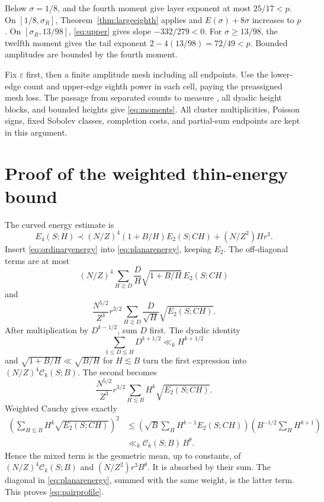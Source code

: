 \documentclass[11pt]{amsart}
\numberwithin{equation}{section}
\begin{document}
Below $\sigma=1/8$, \cite[Theorem 1.3]{dFP} and the
fourth moment give layer exponent at most $25/17<p$.
On $[1/8,\sigma_R]$, Theorem~\ref{thm:largeeighth} applies and
$E(\sigma)+8\sigma$ increases to $p$.
On $[\sigma_R,13/98]$, \eqref{eq:upper} gives slope $-332/279<0$.
For $\sigma\ge13/98$, the twelfth moment gives the tail exponent
$2-4(13/98)=72/49<p$. Bounded amplitudes are bounded by the fourth moment.

Fix $\varepsilon$ first, then a finite amplitude mesh including all endpoints.
Use the lower-edge count and upper-edge eighth power in each cell,
paying the preassigned mesh loss. The passage from separated counts to
measure \cite[Section~\ref*{six-sec:moment}]{Weighted},
all dyadic height blocks, and bounded heights give \eqref{eq:moments}.
All cluster multiplicities, Poisson signs, fixed Sobolev classes,
completion costs, and partial-sum endpoints are kept
in this argument.



\appendix
\section{Proof of the weighted thin-energy bound}\label{app:pairproof}

The curved energy estimate
\cite[Proposition~\ref*{six-prop:curv}]{Weighted} is
\begin{equation}\label{eq:ordinaryenergy}
 E_4(S;H)\prec (N/Z)^4(1+B/H)E_2(S;CH)
                  +(N/Z^2)H r^3.
\end{equation}
Insert \eqref{eq:ordinaryenergy} into \eqref{eq:planarenergy}, keeping \(E_2\).
The off-diagonal terms are at most
\[
 (N/Z)^4\sum_{H\gtrsim D}\frac DH
               \sqrt{1+B/H}\,E_2(S;CH)
\]
and
\[
 \frac{N^{5/2}}{Z^3}r^{3/2}
 \sum_{H\gtrsim D}\frac D{\sqrt H}\sqrt{E_2(S;CH)}.
\]
After multiplication by \(D^{k-1/2}\), sum $D$ first. The dyadic identity
\[
 \sum_{1\le D\lesssim H}D^{k+1/2}\ll_k H^{k+1/2}
\]
and \(\sqrt{1+B/H}\ll\sqrt{B/H}\) for \(H\lesssim B\) turn the
first expression into \((N/Z)^4\mathcal C_k(S;B)\).
The second becomes
\[
 \frac{N^{5/2}}{Z^3}r^{3/2}
       \sum_{H\lesssim B}H^k\sqrt{E_2(S;CH)}.
\]
Weighted Cauchy gives exactly
\[
\begin{split}
 \left(\sum_{H\lesssim B}H^k\sqrt{E_2(S;CH)}\right)^2
 &\le
 \left(\sqrt B\sum_H H^{k-1}E_2(S;CH)\right)
 \left(B^{-1/2}\sum_H H^{k+1}\right)\\
 &\ll_k \mathcal C_k(S;B)\,B^\theta.
\end{split}
\]
Hence the mixed term is the geometric mean, up to constants, of
\((N/Z)^4\mathcal C_k(S;B)\) and \((N/Z^2)r^3B^\theta\).
It is absorbed by their sum. The diagonal in \eqref{eq:planarenergy}, summed with the same
weight, is the latter term. This proves \eqref{eq:pairprofile}.
\end{document}
